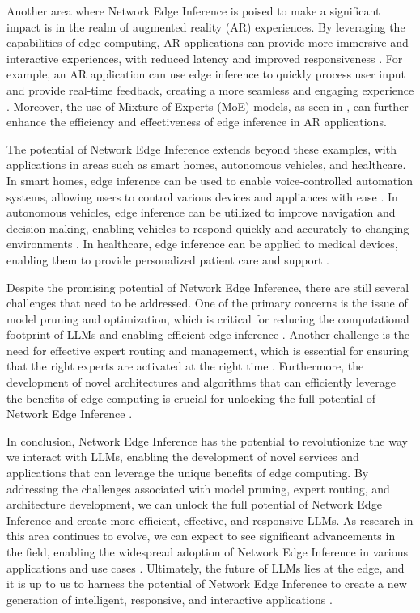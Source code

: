 \documentclass[11pt,a4paper]{article}
\begin{document}
Another area where Network Edge Inference is poised to make a significant impact is in the realm of augmented reality (AR) experiences. By leveraging the capabilities of edge computing, AR applications can provide more immersive and interactive experiences, with reduced latency and improved responsiveness \cite{doi:10.1109/access.2024.3351308}. For example, an AR application can use edge inference to quickly process user input and provide real-time feedback, creating a more seamless and engaging experience \cite{doi:10.1145/3701997}. Moreover, the use of Mixture-of-Experts (MoE) models, as seen in \cite{arxiv:2402.01739}, can further enhance the efficiency and effectiveness of edge inference in AR applications.

The potential of Network Edge Inference extends beyond these examples, with applications in areas such as smart homes, autonomous vehicles, and healthcare. In smart homes, edge inference can be used to enable voice-controlled automation systems, allowing users to control various devices and appliances with ease \cite{doi:10.1109/comst.2025.3527641}. In autonomous vehicles, edge inference can be utilized to improve navigation and decision-making, enabling vehicles to respond quickly and accurately to changing environments \cite{doi:10.1109/tcc.2020.2978846}. In healthcare, edge inference can be applied to medical devices, enabling them to provide personalized patient care and support \cite{doi:10.1109/mnet.2025.3539338}.

Despite the promising potential of Network Edge Inference, there are still several challenges that need to be addressed. One of the primary concerns is the issue of model pruning and optimization, which is critical for reducing the computational footprint of LLMs and enabling efficient edge inference \cite{arxiv:2410.12013}. Another challenge is the need for effective expert routing and management, which is essential for ensuring that the right experts are activated at the right time \cite{arxiv:2406.13233}. Furthermore, the development of novel architectures and algorithms that can efficiently leverage the benefits of edge computing is crucial for unlocking the full potential of Network Edge Inference \cite{arxiv:2410.12247}.

In conclusion, Network Edge Inference has the potential to revolutionize the way we interact with LLMs, enabling the development of novel services and applications that can leverage the unique benefits of edge computing. By addressing the challenges associated with model pruning, expert routing, and architecture development, we can unlock the full potential of Network Edge Inference and create more efficient, effective, and responsive LLMs. As research in this area continues to evolve, we can expect to see significant advancements in the field, enabling the widespread adoption of Network Edge Inference in various applications and use cases \cite{arxiv:2505.20225}. Ultimately, the future of LLMs lies at the edge, and it is up to us to harness the potential of Network Edge Inference to create a new generation of intelligent, responsive, and interactive applications \cite{arxiv:2505.21411}.
\end{document}
